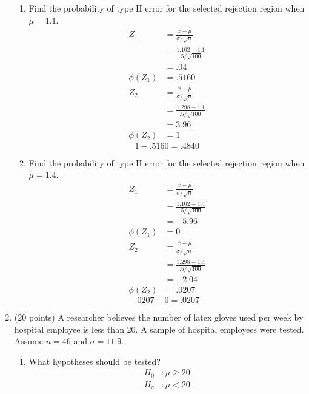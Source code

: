 \documentclass[12pt, letter]{article}
\begin{document}
\begin{enumerate}
\begin{enumerate}
		\item Find the probability of type II error for the selected rejection region when $\mu = 1.1$.
		\begin{align*}
			Z_{1} &= \frac{\bar{x} - \mu}{\sigma/\sqrt{n}} \\
			&= \frac{1.102 - 1.1}{.5/\sqrt{100}} \\
			&= .04 \\
			\phi (Z_{1}) &= .5160
		\end{align*}
		\begin{align*}
			Z_{2} &= \frac{\bar{x} - \mu}{\sigma/\sqrt{n}} \\
			&= \frac{1.298 - 1.1}{.5/\sqrt{100}} \\
			&= 3.96 \\
			\phi (Z_{2}) &= 1
		\end{align*}
		$$1 - .5160 = \boxed{.4840}$$
		
		\item Find the probability of type II error for the selected rejection region when $\mu = 1.4$.
		\begin{align*}
			Z_{1} &= \frac{\bar{x} - \mu}{\sigma/\sqrt{n}} \\
			&= \frac{1.102 - 1.4}{.5/\sqrt{100}} \\
			&= -5.96 \\
			\phi (Z_{1}) &= 0
		\end{align*}
		\begin{align*}
			Z_{2} &= \frac{\bar{x} - \mu}{\sigma/\sqrt{n}} \\
			&= \frac{1.298 - 1.4}{.5/\sqrt{100}} \\
			&= -2.04 \\
			\phi (Z_{2}) &= .0207
		\end{align*}
		$$ .0207 - 0 = \boxed{.0207}$$
	\end{enumerate}
	
	\item (20 points) A researcher believes the number of latex gloves used per week by hospital employee is less than 20. A sample of hospital employees were tested. Assume $n = 46$ and $\sigma = 11.9$.
	\begin{enumerate}
		\item What hypotheses should be tested?
		\begin{align*}
			H_{0}&: \mu \ge 20 \\
			H_{a}&: \mu < 20
		\end{align*}
		

\end{enumerate}
\end{enumerate}
\end{document}

